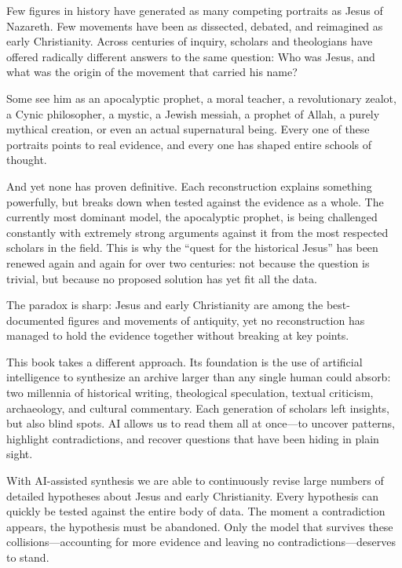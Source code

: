 Few figures in history have generated as many competing portraits as Jesus of Nazareth.
Few movements have been as dissected, debated, and reimagined as early Christianity.
Across centuries of inquiry, scholars and theologians have offered radically different answers to the same question: Who was Jesus, and what was the origin of the movement that carried his name?

Some see him as an apocalyptic prophet, a moral teacher, a revolutionary zealot, a Cynic philosopher, a mystic, a Jewish messiah, a prophet of Allah, a purely mythical creation, or even an actual supernatural being.
Every one of these portraits points to real evidence, and every one has shaped entire schools of thought.

And yet none has proven definitive.
Each reconstruction explains something powerfully, but breaks down when tested against the evidence as a whole.
The currently most dominant model, the apocalyptic prophet, is being challenged constantly with extremely strong arguments against it from the most respected scholars in the field.
This is why the ``quest for the historical Jesus'' has been renewed again and again for over two centuries: not because the question is trivial, but because no proposed solution has yet fit all the data.

The paradox is sharp: Jesus and early Christianity are among the best-documented figures and movements of antiquity, yet no reconstruction has managed to hold the evidence together without breaking at key points.

This book takes a different approach.
Its foundation is the use of artificial intelligence to synthesize an archive larger than any single human could absorb: two millennia of historical writing, theological speculation, textual criticism, archaeology, and cultural commentary.
Each generation of scholars left insights, but also blind spots.
AI allows us to read them all at once—to uncover patterns, highlight contradictions, and recover questions that have been hiding in plain sight.

With AI-assisted synthesis we are able to continuously revise large numbers of detailed hypotheses about Jesus and early Christianity.
Every hypothesis can quickly be tested against the entire body of data.
The moment a contradiction appears, the hypothesis must be abandoned.
Only the model that survives these collisions---accounting for more evidence and leaving no contradictions---deserves to stand.

